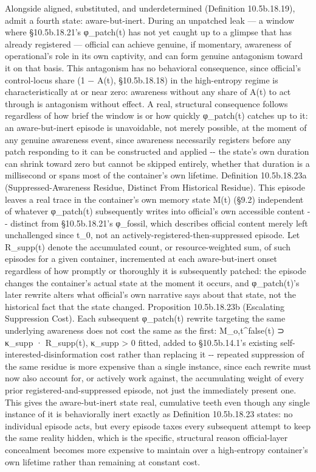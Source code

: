 \documentclass[
]{article}
\begin{document}
Alongside aligned, substituted, and underdetermined (Definition
10.5b.18.19), admit a fourth state: aware-but-inert. During an unpatched
leak --- a window where §10.5b.18.21's φ\_patch(t) has not yet caught up
to a glimpse that has already registered --- official can achieve
genuine, if momentary, awareness of operational's role in its own
captivity, and can form genuine antagonism toward it on that basis. This
antagonism has no behavioral consequence, since official's control-locus
share (1 − A(t), §10.5b.18.18) in the high-entropy regime is
characteristically at or near zero: awareness without any share of A(t)
to act through is antagonism without effect. A real, structural
consequence follows regardless of how brief the window is or how quickly
φ\_patch(t) catches up to it: an aware-but-inert episode is unavoidable,
not merely possible, at the moment of any genuine awareness event, since
awareness necessarily registers before any patch responding to it can be
constructed and applied -\/- the state's own duration can shrink toward
zero but cannot be skipped entirely, whether that duration is a
millisecond or spans most of the container's own lifetime. Definition
10.5b.18.23a (Suppressed-Awareness Residue, Distinct From Historical
Residue). This episode leaves a real trace in the container's own memory
state M(t) (§9.2) independent of whatever φ\_patch(t) subsequently
writes into official's own accessible content -\/- distinct from
§10.5b.18.21's φ\_fossil, which describes official content merely left
unchallenged since t\_0, not an actively-registered-then-suppressed
episode. Let R\_supp(t) denote the accumulated count, or
resource-weighted sum, of such episodes for a given container,
incremented at each aware-but-inert onset regardless of how promptly or
thoroughly it is subsequently patched: the episode changes the
container's actual state at the moment it occurs, and φ\_patch(t)'s
later rewrite alters what official's own narrative says about that
state, not the historical fact that the state changed. Proposition
10.5b.18.23b (Escalating Suppression Cost). Each subsequent φ\_patch(t)
rewrite targeting the same underlying awareness does not cost the same
as the first: M\_o,t\^{}false(t) ⊃ κ\_supp · R\_supp(t), κ\_supp
\textgreater{} 0 fitted, added to §10.5b.14.1's existing
self-interested-disinformation cost rather than replacing it -\/-
repeated suppression of the same residue is more expensive than a single
instance, since each rewrite must now also account for, or actively work
against, the accumulating weight of every prior
registered-and-suppressed episode, not just the immediately present one.
This gives the aware-but-inert state real, cumulative teeth even though
any single instance of it is behaviorally inert exactly as Definition
10.5b.18.23 states: no individual episode acts, but every episode taxes
every subsequent attempt to keep the same reality hidden, which is the
specific, structural reason official-layer concealment becomes more
expensive to maintain over a high-entropy container's own lifetime
rather than remaining at constant cost.
\end{document}
